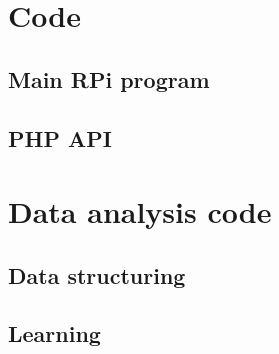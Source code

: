 \documentclass[11pt,twosided,a4paper]{report}
\begin{document}
\chapter{Code}

\section{Main RPi program} \label{code:main_program}



\section{PHP API} \label{php_api}



%
%
%
%
%
%


\chapter{Data analysis code}

\section{Data structuring}

\section{Learning}
\end{document}
